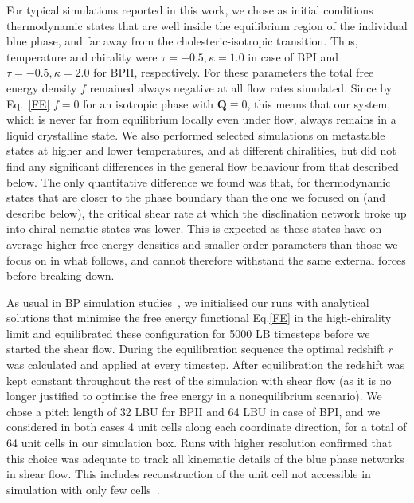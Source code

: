 \documentclass[8.5pt,twoside,twocolumn]{article}
\begin{document}
For typical simulations reported in this work, 
we chose as initial conditions thermodynamic states that are 
well inside the equilibrium region of the individual blue phase, and far away 
from the cholesteric-isotropic transition. Thus, temperature and chirality were 
$\tau=-0.5, \kappa=1.0$ in case of BPI and $\tau=-0.5, \kappa=2.0$ for BPII, respectively.
For these parameters the total free energy density $f$ remained always negative at all flow rates
simulated. 
Since by Eq.~\ref{FE} $f=0$ for an isotropic phase with ${\mathbf Q}\equiv 0$, this means that our system, which is never far from equilibrium locally even under flow, always remains in a liquid crystalline state. 
We also performed selected simulations on metastable states at higher and lower temperatures, 
and at different chiralities, but did not find any significant differences in the 
general flow behaviour from that described below.
The only quantitative difference we found was that, for thermodynamic states that are closer to the phase boundary than the one we focused on (and describe below), the critical shear
rate at which the disclination 
network broke up into chiral nematic states was lower. This is expected as these states have on average higher free energy densities and smaller order parameters than those we focus on in what follows, and cannot therefore withstand the same external forces before breaking down.

As usual in BP simulation studies~\cite{Henrich:2011a,Henrich:2010b}, we initialised our runs with 
analytical solutions that minimise the free energy functional Eq.\ref{FE} in the high-chirality limit 
and equilibrated these configuration for 5000 LB timesteps before we started the shear flow. 
During the equilibration sequence the optimal redshift $r$ was calculated and applied at every timestep.
After equilibration the redshift was kept constant throughout the rest of the simulation with shear flow (as 
it is no longer justified to optimise the free energy in a nonequilibrium scenario).
We chose a pitch length of 32 LBU for BPII and 64 LBU in case of BPI, and we considered in both cases 
4 unit cells along each coordinate direction, for a total of 64 unit cells in our simulation box.
Runs with higher resolution confirmed that this choice was adequate to track  
all kinematic details of the blue phase networks in shear flow. This includes
reconstruction of the unit cell not accessible in simulation with only
few cells~\cite{Dupuis:2005}.
\end{document}
